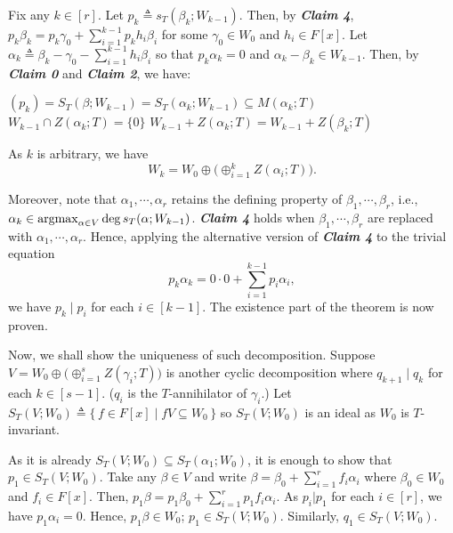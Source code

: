 \documentclass[MAS212_Note.tex]{subfiles}
\begin{document}
{    Fix any \(k \in [r]\).
    Let \(p_k \triangleq s_T(\beta_k; W_{k-1})\).
    Then, by \textbf{\textit{Claim 4}},
    \(p_k \beta_k = p_k \gamma_0 + \sum_{i=1}^{k-1} p_k h_i \beta_i\)
    for some \(\gamma_0 \in W_0\) and \(h_i \in F[x]\).
    Let \(\alpha_k \triangleq \beta_k - \gamma_0 - \sum_{i=1}^{k-1} h_i \beta_i\)
    so that \(p_k \alpha_k = 0\) and \(\alpha_k - \beta_k \in W_{k-1}\).
    Then, by \textbf{\textit{Claim 0}} and  \textbf{\textit{Claim 2}},
    we have:
    \begin{itemize}[nolistsep]
        \ii \((p_k) = S_T(\beta; W_{k-1}) =  S_T(\alpha_k; W_{k-1}) \subseteq M(\alpha_k; T)\)
        \ii \(W_{k-1} \cap Z(\alpha_k; T) = \{0\}\)
        \ii \(W_{k-1} + Z(\alpha_k; T) = W_{k-1} + Z(\beta_k; T)\)
    \end{itemize}
    As \(k\) is arbitrary, we have
    \[
        W_k = W_0 \oplus \big(\oplus_{i=1}^k Z(\alpha_i; T)\big).
    \]

    Moreover, note that \(\alpha_1, \cdots, \alpha_r\) retains the defining property
    of \(\beta_1, \cdots, \beta_r\),
    i.e., \(\alpha_k \in \operatorname*{arg max}_{\alpha \in V} \deg s_T(\alpha; W_{k-1})\).
    \textbf{\textit{Claim 4}} holds when \(\beta_1, \cdots, \beta_r\)
    are replaced with \(\alpha_1, \cdots, \alpha_r\).
    Hence, applying the alternative version of \textbf{\textit{Claim 4}}
    to the trivial equation
    \[
        \textstyle p_k \alpha_k = 0 \cdot 0 + \sum_{i=1}^{k-1} p_i \alpha_i,
    \]
    we have \(p_k \mid p_i\) for each \(i \in [k - 1]\).
    The existence part of the theorem is now proven. \checkmark

    Now, we shall show the uniqueness of such decomposition.
    Suppose \(V = W_0 \oplus \big(\oplus_{i=1}^s Z(\gamma_i; T)\big)\)
    is another cyclic decomposition where \(q_{k+1} \mid q_k\) for each \(k \in [s - 1]\).
    (\(q_i\) is the \(T\)-annihilator of \(\gamma_i\).)
    Let \(S_T(V; W_0) \triangleq \{\,f \in F[x] \mid f V \subseteq W_0\,\}\)
    so \(S_T(V; W_0)\) is an ideal as \(W_0\) is \(T\)-invariant. 

    
    As it is already \(S_T(V; W_0) \subseteq S_T(\alpha_1; W_0)\),
    it is enough to show that \(p_1 \in S_T(V; W_0)\).
    Take any \(\beta \in V\) and write \(\beta = \beta_0 + \sum_{i=1}^{r} f_i \alpha_i\)
    where \(\beta_0 \in W_0\) and \(f_i \in F[x]\).
    Then, \(p_1 \beta = p_1 \beta_0 + \sum_{i=1}^{r} p_1 f_i \alpha_i\).
    As \(p_i | p_1\) for each \(i \in [r]\), we have \(p_1 \alpha_i = 0\).
    Hence, \(p_1 \beta \in W_0\); \(p_1 \in S_T(V; W_0)\).
    Similarly, \(q_1 \in S_T(V; W_0)\). \checkmark

}
\end{document}
